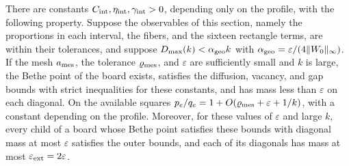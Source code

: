 \begin{proposicion}\label{meso:reconstruccion}
There are constants $C_{\rm int},\eta_{\rm int},\gamma_{\rm int}>0$, depending only on the profile, with the
following property. Suppose the observables of this section, namely the proportions in each interval, the
fibers, and the sixteen rectangle terms, are within their tolerances, and suppose
$D_{\max}(k)<\alpha_{\rm geo} k$ with $\alpha_{\rm geo}=\varepsilon/(4\|W_0\|_\infty)$. If the mesh
$a_{\rm mes}$, the tolerance $\varrho_{\rm mes}$, and $\varepsilon$ are sufficiently small and $k$ is
large, the Bethe point of the board exists, satisfies the diffusion, vacancy, and gap bounds with strict
inequalities for these constants, and has mass less than $\varepsilon$ on each diagonal. On the available
squares $p_e/q_e=1+O(\varrho_{\rm mes}+\varepsilon+1/k)$, with a constant depending on the profile.
Moreover, for these values of $\varepsilon$ and large $k$, every child of a board whose Bethe point
satisfies these bounds with diagonal mass at most $\varepsilon$ satisfies the outer bounds, and each of
its diagonals has mass at most $\varepsilon_{\rm ext}=2\varepsilon$.
\end{proposicion}
